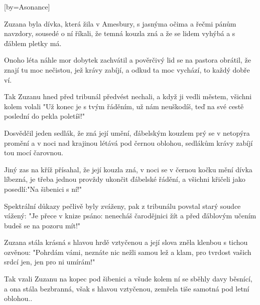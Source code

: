 [by={Asonance}]

\beginverse{}
Zuzana byla dívka, která žila v Amesbury,
s jasnýma očima a řečmi pánům navzdory,
sousedé o ní říkali, že temná kouzla zná
a že se lidem vyhýbá a s ďáblem pletky má.
\endverse{}

\beginverse{}
Onoho léta náhle mor dobytek zachvátil
a pověrčivý lid se na pastora obrátil,
že znají tu moc nečistou, jež krávy zabíjí,
a odkud ta moc vychází, to každý dobře ví.
\endverse{}

\beginverse{}
Tak Zuzanu hned před tribunál předvést nechali,
a když ji vedli městem, všichni kolem volali
"Už konec je s tvým řáděním, už nám neuškodíš,
teď na své cestě poslední do pekla poletíš!"
\endverse{}

\beginverse{}
Dosvědčil jeden sedlák, že zná její umění,
ďábelským kouzlem prý se v netopýra promění
a v noci nad krajinou létává pod černou oblohou,
sedlákům krávy zabíjí tou mocí čarovnou.
\endverse{}

\beginverse{}
Jiný zas na kříž přísahal, že její kouzla zná,
v noci se v černou kočku mění dívka líbezná,
je třeba jednou provždy ukončit ďábelské řádění,
a všichni křičeli jako posedlí:"Na šibenici s ní!"
\endverse{}

\beginverse{}
Spektrální důkazy pečlivě byly zváženy,
pak z tribunálu povstal starý soudce vážený:
"Je přece v knize psáno: nenecháš čarodějnici žít
a před ďáblovým učením budeš se na pozoru mít!"
\endverse{}

\beginverse{}
Zuzana stála krásná s hlavou hrdě vztyčenou
a její slova zněla klenbou s tichou ozvěnou:
"Pohrdám vámi, neznáte nic nežli samou lež a klam,
pro tvrdost vašich srdcí jen, jen pro ni umírám!"
\endverse{}

\beginverse{}
Tak vzali Zuzanu na kopec pod šibenici
a všude kolem ní se sběhly davy běsnící,
a ona stála bezbranná, však s hlavou vztyčenou,
zemřela tiše samotná pod letní oblohou..
\endverse{}

\endsong{}
